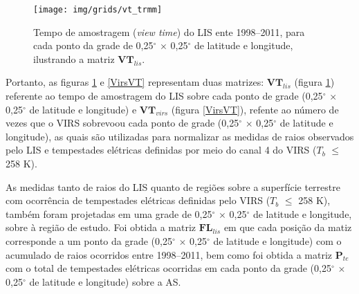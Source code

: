 \begin{figure}[!ht]
  \centering
  {{\texttt{[image: img/grids/vt\_trmm]}} }
  \caption{Tempo de amostragem (\textit{view time}) do LIS ente 1998--2011, para cada ponto da grade de  0,25$^{\circ}$  $\times$ 0,25$^{\circ}$ de latitude e longitude, ilustrando a matriz $\mathbf{VT}_{lis}$. }
\label{lisVT}
\end{figure} 


Portanto, as figuras \ref{lisVT} e \ref{VirsVT} representam duas matrizes: $\mathbf{VT}_{lis}$ (figura \ref{lisVT}) referente ao tempo de amostragem do LIS sobre cada ponto de grade (0,25$^{\circ}$  $\times$ 0,25$^{\circ}$ de latitude e longitude) e  $\mathbf{VT}_{virs}$ (figura \ref{VirsVT}), refente ao número de vezes que o VIRS sobrevoou cada ponto de grade (0,25$^{\circ}$  $\times$ 0,25$^{\circ}$ de latitude e longitude), as quais são utilizadas para normalizar as medidas de raios observados pelo LIS e tempestades elétricas definidas por meio do canal 4 do VIRS ($T_b$ $\leq$ 258 K).  


As medidas tanto de raios do LIS quanto de regiões sobre a superfície terrestre com ocorrência de tempestades elétricas definidas pelo VIRS ($T_b$ $\leq$ 258 K), também foram projetadas em uma grade de  0,25$^{\circ}$ $\times$ 0,25$^{\circ}$ de latitude e longitude, sobre à região de estudo. Foi obtida a matriz $\mathbf{FL}_{lis}$ em que cada posição da matiz corresponde a um ponto da grade (0,25$^{\circ}$ $\times$ 0,25$^{\circ}$ de latitude e longitude) com o acumulado de raios ocorridos entre 1998--2011, bem como foi obtida a matriz $\mathbf{P}_{te}$ com o total de tempestades elétricas ocorridas em cada ponto da grade (0,25$^{\circ}$ $\times$ 0,25$^{\circ}$ de latitude e longitude) sobre a AS.



